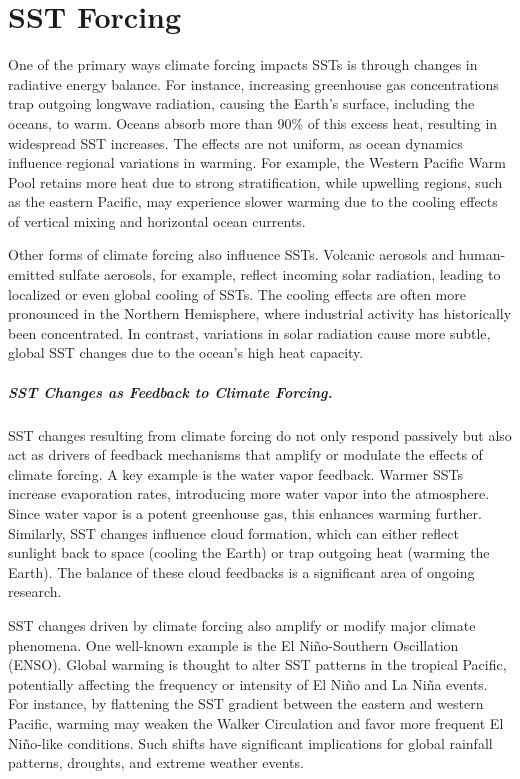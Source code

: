 
\chapter{SST Forcing}
One of the primary ways climate forcing impacts SSTs is through changes in radiative energy balance. For instance, increasing greenhouse gas concentrations trap outgoing longwave radiation, causing the Earth’s surface, including the oceans, to warm. Oceans absorb more than 90\% of this excess heat, resulting in widespread SST increases. The effects are not uniform, as ocean dynamics influence regional variations in warming. For example, the Western Pacific Warm Pool retains more heat due to strong stratification, while upwelling regions, such as the eastern Pacific, may experience slower warming due to the cooling effects of vertical mixing and horizontal ocean currents.

Other forms of climate forcing also influence SSTs. Volcanic aerosols and human-emitted sulfate aerosols, for example, reflect incoming solar radiation, leading to localized or even global cooling of SSTs. The cooling effects are often more pronounced in the Northern Hemisphere, where industrial activity has historically been concentrated. In contrast, variations in solar radiation cause more subtle, global SST changes due to the ocean’s high heat capacity.

\paragraph{SST Changes as Feedback to Climate Forcing.}
SST changes resulting from climate forcing do not only respond passively but also act as drivers of feedback mechanisms that amplify or modulate the effects of climate forcing. A key example is the water vapor feedback. Warmer SSTs increase evaporation rates, introducing more water vapor into the atmosphere. Since water vapor is a potent greenhouse gas, this enhances warming further. Similarly, SST changes influence cloud formation, which can either reflect sunlight back to space (cooling the Earth) or trap outgoing heat (warming the Earth). The balance of these cloud feedbacks is a significant area of ongoing research.


SST changes driven by climate forcing also amplify or modify major climate phenomena. One well-known example is the El Niño-Southern Oscillation (ENSO). Global warming is thought to alter SST patterns in the tropical Pacific, potentially affecting the frequency or intensity of El Niño and La Niña events. For instance, by flattening the SST gradient between the eastern and western Pacific, warming may weaken the Walker Circulation and favor more frequent El Niño-like conditions. Such shifts have significant implications for global rainfall patterns, droughts, and extreme weather events.

